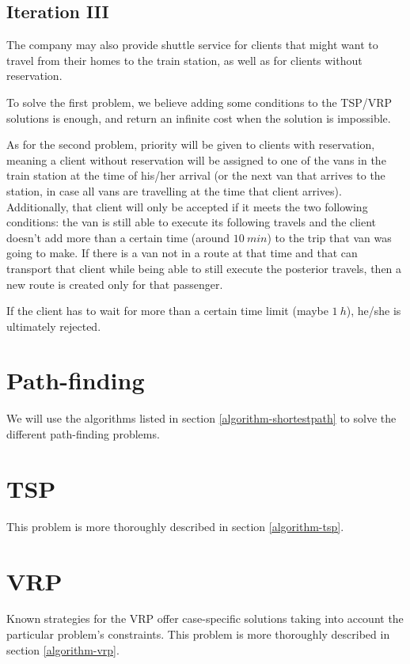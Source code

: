\subsection{Iteration III}
The company may also provide shuttle service for clients that might want to travel from their homes to the train station, as well as for clients without reservation.\par
To solve the first problem, we believe adding some conditions to the TSP/VRP solutions is enough, and return an infinite cost when the solution is impossible.\par
As for the second problem, priority will be given to clients with reservation, meaning a client without reservation will be assigned to one of the vans in the train station at the time of his/her arrival (or the next van that arrives to the station, in case all vans are travelling at the time that client arrives). Additionally, that client will only be accepted if it meets the two following conditions: the van is still able to execute its following travels and the client doesn't add more than a certain time (around $\SI{10}{min}$) to the trip that van was going to make. If there is a van not in a route at that time and that can transport that client while being able to still execute the posterior travels, then a new route is created only for that passenger.\par
If the client has to wait for more than a certain time limit (maybe $\SI{1}{h}$), he/she is ultimately rejected.
\section{Path-finding} \label{problem-decomposition-pathfinding}
We will use the algorithms listed in section \ref{algorithm-shortestpath} to solve the different path-finding problems.
\section{\texorpdfstring{\Acrlong*{TSP}}{Travelling salesman problem}} \label{problem-decomposition-tsp}
This problem is more thoroughly described in section \ref{algorithm-tsp}.
\section{\texorpdfstring{\Acrlong*{VRP}}{Vehicle routing problem}} \label{problem-decomposition-vrp}
Known strategies for the \acrshort{VRP} offer case-specific solutions taking into account the particular problem's constraints. This problem is more thoroughly described in section \ref{algorithm-vrp}.
